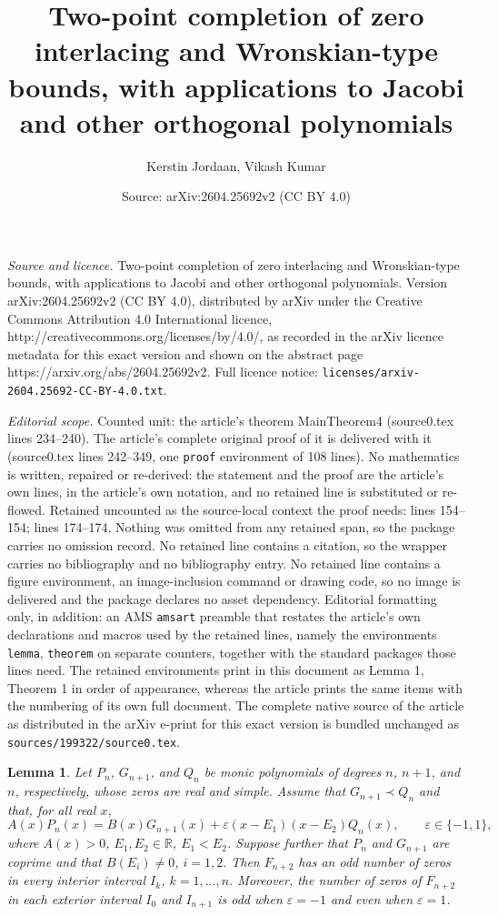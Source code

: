 \documentclass[10pt,a4paper]{amsart}
\title{Two-point completion of zero interlacing and Wronskian-type bounds, with applications to Jacobi and other orthogonal polynomials}
\author{Kerstin Jordaan, Vikash Kumar}
\date{Source: arXiv:2604.25692v2 (CC BY 4.0)}
\newtheorem{lemma}{Lemma}
\begin{document}
\maketitle

\noindent\emph{Source and licence.} Two-point completion of zero interlacing and Wronskian-type bounds, with applications to Jacobi and other orthogonal polynomials. Version arXiv:2604.25692v2 (CC BY 4.0), distributed by arXiv under the Creative Commons Attribution 4.0 International licence, http://creativecommons.org/licenses/by/4.0/, as recorded in the arXiv licence metadata for this exact version and shown on the abstract page https://arxiv.org/abs/2604.25692v2. Full licence notice: \texttt{licenses/arxiv-2604.25692-CC-BY-4.0.txt}.\par\smallskip

\noindent\textit{Editorial scope.} Counted unit: the article's theorem MainTheorem4 (source0.tex lines 234--240). The article's complete original proof of it is delivered with it (source0.tex lines 242--349, one \texttt{proof} environment of 108 lines). No mathematics is written, repaired or re-derived: the statement and the proof are the article's own lines, in the article's own notation, and no retained line is substituted or re-flowed.  Retained uncounted as the source-local context the proof needs: lines 154--154; lines 174--174.  Nothing was omitted from any retained span, so the package carries no omission record.  No retained line contains a citation, so the wrapper carries no bibliography and no bibliography entry.  No retained line contains a figure environment, an image-inclusion command or drawing code, so no image is delivered and the package declares no asset dependency.  Editorial formatting only, in addition: an AMS \texttt{amsart} preamble that restates the article's own declarations and macros used by the retained lines, namely the environments \texttt{lemma}, \texttt{theorem} on separate counters, together with the standard packages those lines need.  The retained environments print in this document as Lemma 1, Theorem 1 in order of appearance, whereas the article prints the same items with the numbering of its own full document.  The complete native source of the article as distributed in the arXiv e-print for this exact version is bundled unchanged as \texttt{sources/199322/source0.tex}.
\begin{lemma}\label{lem:parity-counting} Let $P_n$, $G_{n+1}$, and $Q_n$ be monic polynomials of degrees $n$, $n+1$, and $n$, respectively, whose zeros are real and simple. Assume that $G_{n+1}\prec Q_n$ and that, for all real $x$, \begin{equation} A(x)P_n(x) = B(x)G_{n+1}(x) + \varepsilon (x-E_1)(x-E_2)Q_n(x), \qquad \varepsilon\in\{-1,1\}, \label{eq:general-signed-recurrence} \end{equation} where $A(x)>0$, $E_1,E_2\in \mathbb{R}$, $E_1<E_2$. Suppose further that $P_n$ and $G_{n+1}$ are coprime and that $B(E_i)\neq 0$, $i=1,2.$ Then $F_{n+2}$ has an odd number of zeros in every interior interval $I_k$, $k=1,\dots,n$. Moreover, the number of zeros of $F_{n+2}$ in each exterior interval $I_0$ and $I_{n+1}$ is odd when $\varepsilon=-1$ and even when $\varepsilon =1$.\end{lemma} 
\end{document}
